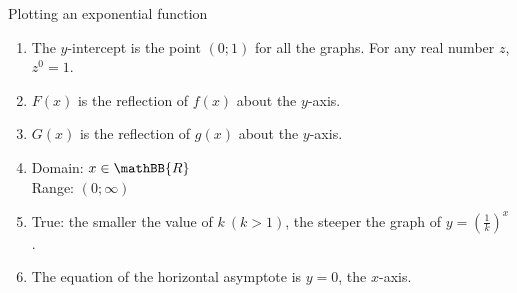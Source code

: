 \begin{wex}{Plotting an exponential function}
{\begin{enumerate}[noitemsep, label=\textbf{\arabic*}. ] 
\item The $y$-intercept is the point $(0; 1)$ for all the graphs. For any real number $z$, $z^{0}=1$.
\item $F(x)$ is the reflection of $f(x)$ about the $y$-axis. 
\item $G(x)$ is the reflection of $g(x)$ about the $y$-axis. 
\item  Domain: $x \in \mathBB{R}$\\
Range: $(0; \infty)$
\item True: the smaller the value of $k ~(k>1)$, the steeper the graph of $y=(\frac{1}{k})^{x}$.
\item The equation of the horizontal asymptote is $y=0$, the $x$-axis.
\end{enumerate}

}
\end{wex}

   

